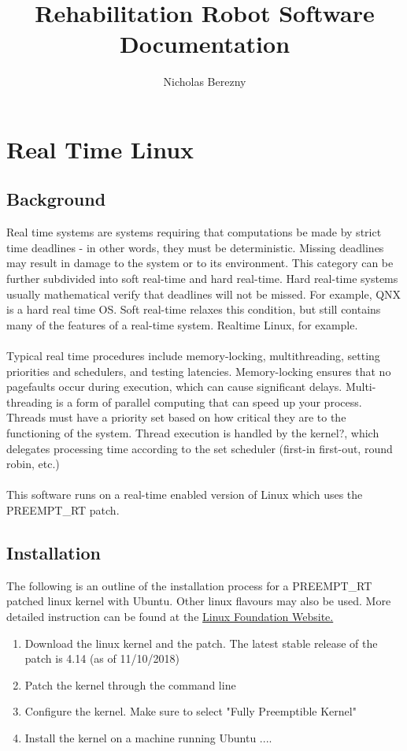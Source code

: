 \documentclass{article}
\author{Nicholas Berezny}
\title{Rehabilitation Robot Software Documentation}
\begin{document}
\maketitle
\newpage

\section{Real Time Linux}
	\subsection{Background}
	
	Real time systems are systems requiring that computations be made by strict time deadlines - in other words, they must be deterministic. Missing deadlines may result in damage to the system or to its environment. This category can be further subdivided into soft real-time and hard real-time. Hard real-time systems usually mathematical verify that deadlines will not be missed.  For example, QNX is a hard real time OS. Soft real-time relaxes this condition, but still contains many of the features of a real-time system. Realtime Linux, for example. 
	\\ \\
	Typical real time procedures include memory-locking, multithreading, setting priorities and schedulers, and testing latencies. Memory-locking ensures that no pagefaults occur during execution, which can cause significant delays. Multi-threading is a form of parallel computing that can speed up your process. Threads must have a priority set based on how critical they are to the functioning of the system. Thread execution is handled by the kernel?, which delegates processing time according to the set scheduler (first-in first-out, round robin, etc.) 
	\\ \\
	This software runs on a real-time enabled version of Linux which uses the PREEMPT\_RT patch. 
	
		
	
	\subsection{Installation}
	
	The following is an outline of the installation process for a PREEMPT\_RT patched linux kernel with Ubuntu. Other linux flavours may also be used. More detailed instruction can be found at the \href{https://wiki.linuxfoundation.org/realtime/documentation/howto/applications/preemptrt_setup}{Linux Foundation Website.}
	\begin{enumerate}
		\item Download the linux kernel and the patch. The latest stable release of the patch is  4.14 (as of 11/10/2018)
		\item Patch the kernel through the command line
		\item Configure the kernel. Make sure to select "Fully Preemptible Kernel"
		\item Install the kernel on a machine running Ubuntu ....
	\end{enumerate}
	
\end{document}
